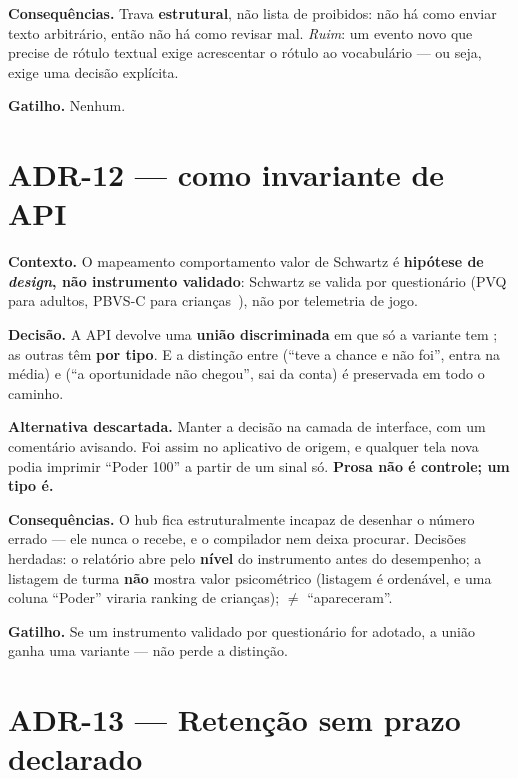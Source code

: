 \textbf{Consequências.} Trava \textbf{estrutural}, não lista de proibidos: não há
como enviar texto arbitrário, então não há como revisar mal. \emph{Ruim}: um
evento novo que precise de rótulo textual exige acrescentar o rótulo ao
vocabulário --- ou seja, exige uma decisão explícita.

\textbf{Gatilho.} Nenhum.

\section{ADR-12 ---  como invariante de API}

\textbf{Contexto.} O mapeamento comportamento \seta{} valor de Schwartz é
\textbf{hipótese de \emph{design}, não instrumento validado}: Schwartz se valida
por questionário (PVQ para adultos, PBVS-C para
crianças~\cite{schwartz2012overview,doring2010pbvsc}), não por telemetria de jogo.

\textbf{Decisão.} A API devolve uma \textbf{união discriminada} em que só a
variante  tem ; as outras têm 
\textbf{por tipo}. E a distinção entre  (\enquote{teve a chance e não
foi}, entra na média) e  (\enquote{a oportunidade não chegou}, sai da
conta) é preservada em todo o caminho.

\textbf{Alternativa descartada.} Manter a decisão na camada de interface, com um
comentário avisando. Foi assim no aplicativo de origem, e qualquer tela nova podia
imprimir \enquote{Poder 100} a partir de um sinal só. \textbf{Prosa não é
controle; um tipo é.}

\textbf{Consequências.} O hub fica estruturalmente incapaz de desenhar o número
errado --- ele nunca o recebe, e o compilador nem deixa procurar. Decisões
herdadas: o relatório abre pelo \textbf{nível} do instrumento antes do desempenho;
a listagem de turma \textbf{não} mostra valor psicométrico (listagem é ordenável,
e uma coluna \enquote{Poder} viraria ranking de crianças);
 $\neq$ \enquote{apareceram}.

\textbf{Gatilho.} Se um instrumento validado por questionário for adotado, a
união ganha uma variante --- não perde a distinção.

\section{ADR-13 --- Retenção sem prazo declarado}

